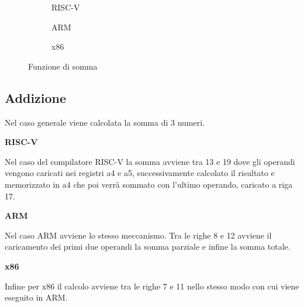 \documentclass[12pt,a4paper]{report}
\begin{document}
\begin{figure}[h!]
     
     \begin{subfigure}{0.3\textwidth}
  
        
\label{Code:AddRISCV}
\caption{RISC-V}
     \end{subfigure}
     \hfill
     \begin{subfigure}{0.3\textwidth}
         
          
\caption{ARM}
\label{Code:AddARM}
     \end{subfigure}
     \hfill
     \begin{subfigure}{0.3\textwidth}
         
          
	 \caption{x86}
	\label{Code:Addx86}
     \end{subfigure}
    
        \caption{Funzione di somma}
        
\end{figure}

\subsection{Addizione}
Nel caso generale viene calcolata la somma di 3 numeri.



\vspace{0.3 cm}
\textbf{RISC-V}

Nel caso del compilatore RISC-V la somma avviene tra 13 e 19 dove gli operandi vengono caricati nei registri a4 e a5,  successivamente calcolato il risultato e memorizzato in a4 che poi verrà sommato con l'ultimo operando, caricato a riga 17.

\vspace{0.3 cm}
\textbf{ARM}

Nel caso ARM avviene lo stesso meccanismo. Tra le righe 8 e 12 avviene il caricamento dei primi due operandi la somma parziale e infine la somma totale.

\vspace{0.3 cm}
\textbf{x86}

Infine per x86 il calcolo avviene tra le righe 7 e 11 nello stesso modo con cui viene eseguito in ARM.
\end{document}
